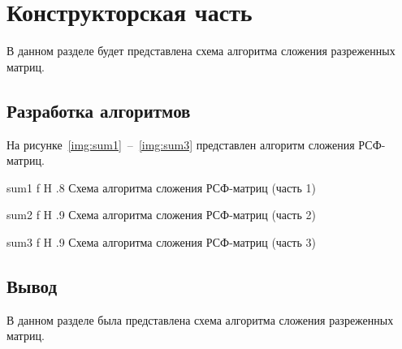 \chapter{Конструкторская часть}
В данном разделе будет представлена схема алгоритма сложения разреженных матриц.

\section{Разработка алгоритмов}
На рисунке~\ref{img:sum1}~--~\ref{img:sum3} представлен  алгоритм сложения РСФ-матриц.

{sum1}
{f}
{H}
{.8\textwidth}
{Схема алгоритма сложения РСФ-матриц (часть 1)}

{sum2}
{f}
{H}
{.9\textwidth}
{Схема алгоритма сложения РСФ-матриц (часть 2)}

{sum3}
{f}
{H}
{.9\textwidth}
{Схема алгоритма сложения РСФ-матриц (часть 3)}

\section*{Вывод}
В данном разделе была представлена схема алгоритма сложения разреженных матриц.